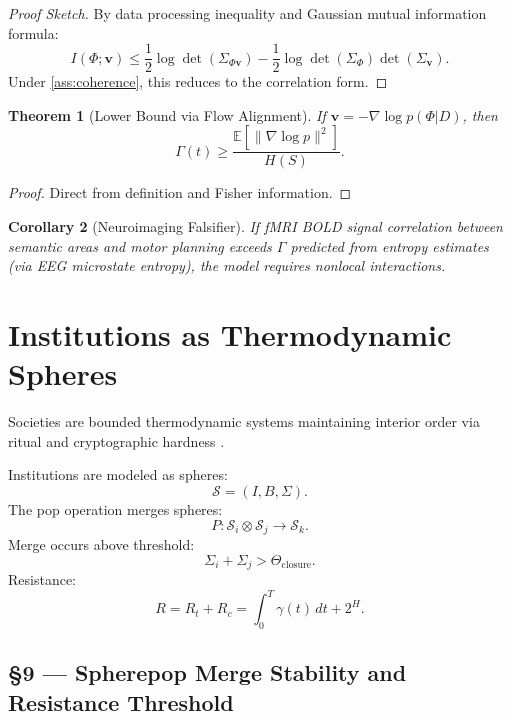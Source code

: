 \documentclass[11pt]{article}
\newtheorem{theorem}{Theorem}[section]
\newtheorem{corollary}[theorem]{Corollary}
\theoremstyle{definition}
\theoremstyle{remark}
\newcommand{\vect}[1]{\bm{#1}}
\begin{document}
\begin{proof}[Proof Sketch]
By data processing inequality and Gaussian mutual information formula:
\[
I(\Phi;\vect{v}) \le \frac{1}{2} \log \det(\Sigma_{\Phi\vect{v}}) - \frac{1}{2} \log \det(\Sigma_{\Phi}) \det(\Sigma_{\vect{v}}).
\]
Under \cref{ass:coherence}, this reduces to the correlation form.
\end{proof}

\begin{theorem}[Lower Bound via Flow Alignment]
If $\vect{v} = -\nabla \log p(\Phi|D)$, then
\[
\Gamma(t) \ge \frac{\mathbb{E}[\|\nabla \log p\|^2]}{H(S)}.
\]
\end{theorem}

\begin{proof}
Direct from definition and Fisher information.
\end{proof}

\begin{corollary}[Neuroimaging Falsifier]
If fMRI BOLD signal correlation between semantic areas and motor planning exceeds $\Gamma$ predicted from entropy estimates (via EEG microstate entropy), the model requires nonlocal interactions.
\end{corollary}

\section{Institutions as Thermodynamic Spheres}
Societies are bounded thermodynamic systems maintaining interior order via ritual and cryptographic hardness \cite{Deacon2012}.

Institutions are modeled as spheres:
\begin{equation}
\boxed{\mathcal{S}=(I,B,\Sigma).}
\end{equation}
The pop operation merges spheres:
\begin{equation}
\boxed{P:\mathcal{S}_i\otimes\mathcal{S}_j\to\mathcal{S}_k.}
\end{equation}
Merge occurs above threshold:
\begin{equation}
\boxed{\Sigma_i+\Sigma_j>\Theta_{\mathrm{closure}}.}
\end{equation}
Resistance:
\begin{equation}
\boxed{R=R_t+R_c=\int_0^T\gamma(t)\,dt + 2^{H}.}
\end{equation}

\subsection*{§9 — Spherepop Merge Stability and Resistance Threshold}
\end{document}
